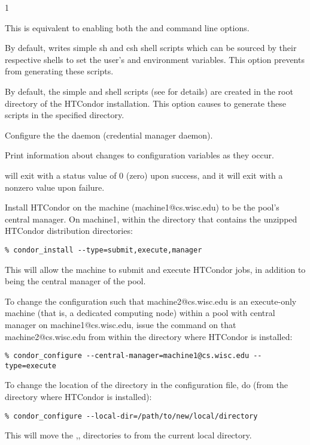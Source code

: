 \begin{ManPage}{\label{man-condor-configure}}{1}
\begin{Options}
   {
    This is equivalent to enabling both the  and
     command line options.  }

   {
    By default,  writes simple sh and csh
    shell scripts which can be sourced by their respective
    shells to set the user's  and 
    environment
    variables.  This option prevents  from
    generating these scripts.  }

   {
    By default, the simple  and  shell scripts (see
     for details) are created in 
    the root directory of the HTCondor installation.  This option
    causes  to generate these scripts in the
    specified directory.  }

   {Configure the
    the  daemon (credential manager daemon).}

   {Print information about changes
    to configuration variables as they occur.}
\end{Options}

\ExitStatus

 will exit with a status value of 0 (zero) upon success,
and it will exit with a nonzero value upon failure.

\Examples
Install HTCondor on the machine (machine1@cs.wisc.edu)
to be the pool's central manager.
On machine1,
within the directory that contains the unzipped HTCondor
distribution directories:
\footnotesize
\begin{verbatim}
% condor_install --type=submit,execute,manager
\end{verbatim}
\normalsize
This will allow the machine to submit and execute HTCondor jobs, 
in addition to being the central manager of the pool.


To change the configuration such that
machine2@cs.wisc.edu is an execute-only machine
(that is, a dedicated computing node)
within a pool with central manager on machine1@cs.wisc.edu,
issue the command on that machine2@cs.wisc.edu
from within the directory where HTCondor is installed:
\footnotesize
\begin{verbatim}
% condor_configure --central-manager=machine1@cs.wisc.edu --type=execute
\end{verbatim}
\normalsize



To change the location of the  directory
in the configuration file, do (from the directory where HTCondor is installed):
\footnotesize
\begin{verbatim}
% condor_configure --local-dir=/path/to/new/local/directory
\end{verbatim}
\normalsize
This will move the ,, directories
to  from the current local directory.



\end{ManPage}
